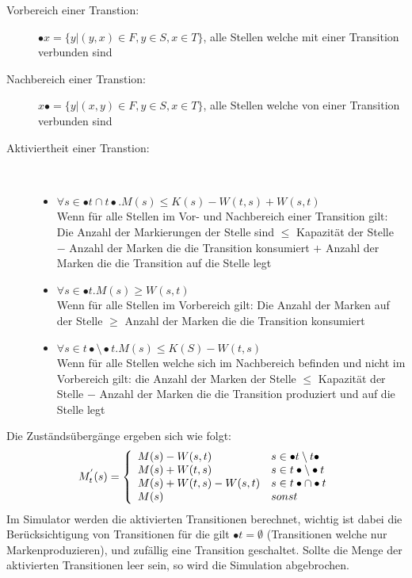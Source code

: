 \documentclass[11pt, fleqn, a4paper, leqno]{scrartcl} %
\begin{document}
		\begin{description}
			\item[Vorbereich einer Transtion:] $\bullet x = \{y|(y,x)\in F, y \in S, x \in T\}$, alle Stellen welche  mit einer Transition verbunden sind
			\item[Nachbereich einer Transtion:] $x\bullet = \{y|(x,y)\in F, y \in S, x \in T\}$, alle Stellen welche von einer Transition verbunden sind
			\item[Aktiviertheit einer Transtion:] \ \\
				\begin{itemize}
					\item $\forall s \in \bullet t \cap t \bullet . M(s) \leq K(s) - W(t,s) + W(s,t)$\\
					Wenn für alle Stellen im Vor- und Nachbereich einer Transition gilt: Die Anzahl der Markierungen der Stelle sind $\leq$ Kapazität der Stelle $-$  Anzahl der Marken die die Transition konsumiert $+$ Anzahl der Marken die die Transition auf die Stelle legt
					\item $\forall s \in \bullet t.M(s) \geq W(s,t)$\\
					Wenn für alle Stellen im Vorbereich gilt: Die Anzahl der Marken auf der Stelle $\geq$ Anzahl der Marken die die Transition konsumiert
					\item $\forall s \in t \bullet \setminus \bullet t.M(s) \leq K(S) - W(t,s)$\\
					Wenn für alle Stellen welche sich im Nachbereich befinden und nicht im Vorbereich gilt: die Anzahl der Marken der Stelle $\leq$ Kapazität der Stelle $-$ Anzahl der Marken die die Transition produziert und auf die Stelle legt
				\end{itemize}
		\end{description}
	Die Zuständsübergänge ergeben sich wie folgt:
	\begin{equation*}
		M_{t}^{'}(s)= \left\{ 
		\begin{array}{l l}
			M(s) - W(s,t) & s \in \bullet t \setminus t\bullet \\
			M(s) + W(t,s) & s \in t \bullet \setminus \bullet t\\
			M(s)+W(t,s)-W(s,t) & s \in t\bullet \cap \bullet t \\
			M(s) & sonst
		\end{array} \right.
	\end{equation*}
	Im Simulator werden die aktivierten Transitionen berechnet, wichtig ist dabei die Berücksichtigung von Transitionen für die gilt $\bullet t = \emptyset$ (Transitionen welche nur Markenproduzieren), und zufällig eine Transition geschaltet. Sollte die Menge der aktivierten Transitionen leer sein, so wird die Simulation abgebrochen.
\end{document}
